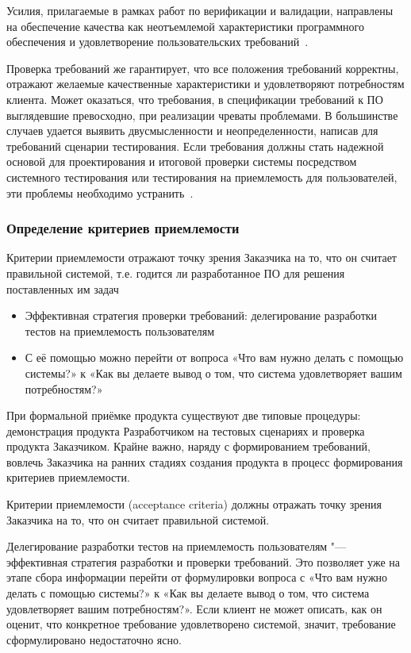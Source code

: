 \documentclass{../industrial-development}
\begin{document}
{Усилия, прилагаемые в рамках работ по верификации и валидации, направлены на обеспечение качества как неотъемлемой характеристики программного обеспечения и удовлетворение пользовательских требований~\cite[с.~64--65]{Maglinec}.

Проверка требований же гарантирует, что все положения требований корректны, отражают желаемые качественные характеристики и удовлетворяют потребностям клиента. Может оказаться, что требования, в спецификации требований к ПО выглядевшие превосходно, при реализации чреваты проблемами. В большинстве случаев удается выявить двусмысленности и неопределенности, написав для требований сценарии тестирования. Если требования должны стать надежной основой для проектирования и итоговой проверки системы посредством системного тестирования или тестирования на приемлемость для пользователей, эти проблемы необходимо устранить~\cite[с.~51]{Wiegers}.


\begin{frame} \frametitle {Определение критериев приемлемости}


\alert{Критерии приемлемости} отражают точку зрения Заказчика на то, что он считает правильной системой, т.е. годится ли разработанное ПО для решения поставленных им задач

		\begin{itemize}
\item Эффективная стратегия проверки требований: делегирование разработки тестов на приемлемость пользователям
\item С её помощью можно перейти от вопроса «Что вам нужно делать с помощью системы?» к «Как вы делаете вывод о том, что система удовлетворяет вашим потребностям?»
\end{itemize}
\end{frame}


\lecturenotes

При формальной приёмке продукта существуют две типовые процедуры: демонстрация продукта Разработчиком на тестовых сценариях и проверка продукта Заказчиком. Крайне важно, наряду с формированием требований, вовлечь Заказчика на ранних стадиях создания продукта в процесс формирования критериев приемлемости. 

\alert{Критерии приемлемости (acceptance criteria)} должны отражать точку зрения Заказчика на то, что он считает правильной системой.

Делегирование разработки тестов на приемлемость пользователям "--- эффективная стратегия разработки и проверки требований. Это позволяет уже на этапе сбора информации перейти от формулировки вопроса с «Что вам нужно делать с помощью системы?» к «Как вы делаете вывод о том, что система удовлетворяет вашим потребностям?». Если клиент не может описать, как он оценит, что конкретное требование удовлетворено системой, значит, требование сформулировано недостаточно ясно.

}
\end{document}
